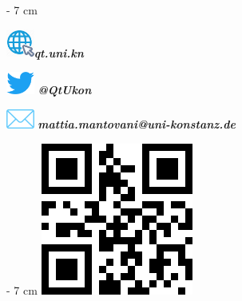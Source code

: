 \documentclass[rgb]{article}
\begin{document}
%
%		
%		
%		

\begin{textfeld}{0cm}{\paperheight - 7 cm}%

 \hfill
\begin{fitbox}{30cm}{5cm}
	\begin{flushright}
			
	\includegraphics[width=26pt]{graphics/website.png}\hskip
	10pt\textcolor{seeblau100}{\textbf{\textit{qt.uni.kn}}}
	

	\includegraphics[width=26pt]{graphics/twitter_Logo.png}\hskip
	10pt
	\textcolor{seeblau100}{\textbf{\textit{@QtUkon}}}
	

	\includegraphics[width=26pt]{email.png}\hskip 
	10pt
	\textcolor{seeblau100}{\textbf{\textit{mattia.mantovani@uni-konstanz.de}}}
	\end{flushright}
\end{fitbox}
\end{textfeld}%

\begin{textfeld}{0cm}{\paperheight - 7 cm}
	\rightskip 2cm
	\hfill\includegraphics[height=5cm]{qr.png}
\end{textfeld}
\end{document}
